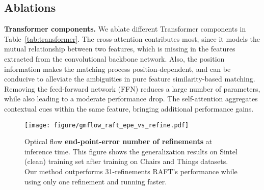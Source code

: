 \documentclass[10pt,twocolumn,letterpaper]{article}
\begin{document}
\subsection{Ablations}
\label{sec:ablation}


{\bf Transformer components.} We ablate different Transformer components in Table~\ref{tab:transformer}. The cross-attention contributes most, since it models the mutual relationship between two features, which is missing in the features extracted from the convolutional backbone network. Also, the position information makes the matching process position-dependent, and can be conducive to alleviate the ambiguities in pure feature similarity-based matching. Removing the feed-forward network (FFN) reduces a large number of parameters, while also leading to a moderate performance drop. The self-attention aggregates contextual cues within the same feature, bringing additional performance gains.



    
    
    

    
    


    
    
 
    
    
    

    
    



    
    
    
    
    
    














\begin{figure}[t]
    \centering
    \texttt{[image: figure/gmflow\_raft\_epe\_vs\_refine.pdf]}
    \vspace{-12pt}
    \caption{Optical flow \textbf{end-point-error \vs number of refinements} at inference time. This figure shows the generalization results on Sintel (clean) training set after training on Chairs and Things datasets. 
    Our method outperforms 31-refinements RAFT's performance while using only one refinement and running faster.
    }
    \label{fig:iter_vs_epe}
    \vspace{-12pt}
\end{figure}
\end{document}
